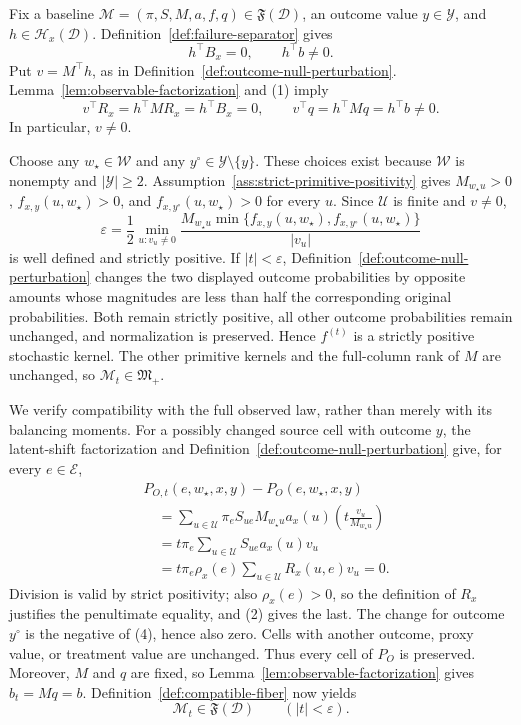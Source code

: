 Fix a baseline \(\mathcal M=(\pi,S,M,a,f,q)\in\mathfrak F(\mathcal D)\), an outcome value \(y\in\mathcal Y\), and \(h\in\mathcal H_x(\mathcal D)\).  Definition~\ref{def:failure-separator} gives
\[
h^{\top}B_x=0,
\qquad
h^{\top}b\ne0.
\tag{1}
\]
Put \(v=M^{\top}h\), as in Definition~\ref{def:outcome-null-perturbation}.  Lemma~\ref{lem:observable-factorization} and (1) imply
\[
v^{\top}R_x=h^{\top}MR_x=h^{\top}B_x=0,
\qquad
v^{\top}q=h^{\top}Mq=h^{\top}b\ne0.
\tag{2}
\]
In particular, \(v\ne0\).

Choose any \(w_{\star}\in\mathcal W\) and any \(y^{\circ}\in\mathcal Y\setminus\{y\}\).  These choices exist because \(\mathcal W\) is nonempty and \(\lvert\mathcal Y\rvert\ge2\).  Assumption~\ref{ass:strict-primitive-positivity} gives \(M_{w_{\star}u}>0\), \(f_{x,y}(u,w_{\star})>0\), and \(f_{x,y^{\circ}}(u,w_{\star})>0\) for every \(u\).  Since \(\mathcal U\) is finite and \(v\ne0\),
\[
\varepsilon
=\frac12\min_{u:v_u\ne0}
\frac{M_{w_{\star}u}\min\{f_{x,y}(u,w_{\star}),
f_{x,y^{\circ}}(u,w_{\star})\}}{|v_u|}
\tag{3}
\]
is well defined and strictly positive.  If \(|t|<\varepsilon\), Definition~\ref{def:outcome-null-perturbation} changes the two displayed outcome probabilities by opposite amounts whose magnitudes are less than half the corresponding original probabilities.  Both remain strictly positive, all other outcome probabilities remain unchanged, and normalization is preserved.  Hence \(f^{(t)}\) is a strictly positive stochastic kernel.  The other primitive kernels and the full-column rank of \(M\) are unchanged, so \(\mathcal M_t\in\mathfrak M_{+}\).

We verify compatibility with the full observed law, rather than merely with its balancing moments.  For a possibly changed source cell with outcome \(y\), the latent-shift factorization and Definition~\ref{def:outcome-null-perturbation} give, for every \(e\in\mathcal E\),
\[
\begin{aligned}
&P_{O,t}(e,w_{\star},x,y)-P_O(e,w_{\star},x,y)\\
&\quad=\sum_{u\in\mathcal U}\pi_eS_{ue}M_{w_{\star}u}a_x(u)
\left(t\frac{v_u}{M_{w_{\star}u}}\right)\\
&\quad=t\pi_e\sum_{u\in\mathcal U}S_{ue}a_x(u)v_u\\
&\quad=t\pi_e\rho_x(e)\sum_{u\in\mathcal U}R_x(u,e)v_u
=0.
\end{aligned}
\tag{4}
\]
Division is valid by strict positivity; also \(\rho_x(e)>0\), so the definition of \(R_x\) justifies the penultimate equality, and (2) gives the last.  The change for outcome \(y^{\circ}\) is the negative of (4), hence also zero.  Cells with another outcome, proxy value, or treatment value are unchanged.  Thus every cell of \(P_O\) is preserved.  Moreover, \(M\) and \(q\) are fixed, so Lemma~\ref{lem:observable-factorization} gives \(b_t=Mq=b\).  Definition~\ref{def:compatible-fiber} now yields
\[
\mathcal M_t\in\mathfrak F(\mathcal D)
\qquad(|t|<\varepsilon).
\tag{5}
\]

